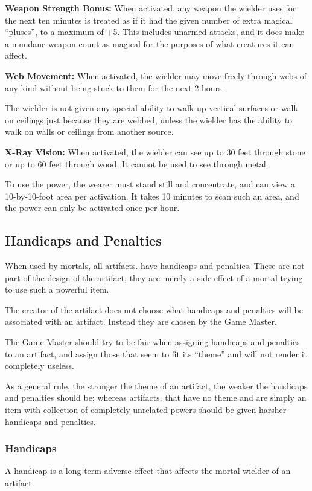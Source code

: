 \begin{multicols*}{2}
\textbf{Weapon Strength Bonus:} When activated, any weapon the wielder uses for the next ten minutes is treated as if it had the given number of extra magical “pluses”, to a maximum of +5. This includes unarmed attacks, and it does make a mundane weapon count as magical for the purposes of what creatures it can affect.

\textbf{Web Movement:} When activated, the wielder may move freely through webs of any kind without being stuck to them for the next 2 hours.

The wielder is not given any special ability to walk up vertical surfaces or walk on ceilings just because they are webbed, unless the wielder has the ability to walk on walls or ceilings from another source.

\textbf{X-Ray Vision:} When activated, the wielder can see up to 30 feet through stone or up to 60 feet through wood. It cannot be used to see through metal.

To use the power, the wearer must stand still and concentrate, and can view a 10-by-10-foot area per activation. It takes 10 minutes to scan such an area, and the power can only be activated once per hour.

\subsection{Handicaps and Penalties}
When used by mortals, all artifacts. have handicaps and penalties. These are not part of the design of the artifact, they are merely a side effect of a mortal trying to use such a powerful item.

The creator of the artifact does not choose what handicaps and penalties will be associated with an artifact. Instead they are chosen by the Game Master.

The Game Master should try to be fair when assigning handicaps and penalties to an artifact, and assign those that seem to fit its “theme” and will not render it completely useless.

As a general rule, the stronger the theme of an artifact, the weaker the handicaps and penalties should be; whereas artifacts. that have no theme and are simply an item with collection of completely unrelated powers should be given harsher handicaps and penalties.

\subsubsection{Handicaps}
A handicap is a long-term adverse effect that affects the mortal wielder of an artifact.


\end{multicols*}
